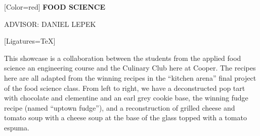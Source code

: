 \documentclass{article}
\begin{document}
{

	[Color=red]
	\fontsize{0.8in}{0.6in}\selectfont 
	\bfseries
	FOOD SCIENCE
}

\vspace{0.25in}

{
	\fontsize{0.4in}{0.4in}\selectfont
	ADVISOR: DANIEL LEPEK
}

\vspace{0.2in}

{
	[Ligatures=TeX]
	\fontsize{0.4in}{0.46in}\selectfont

	This showcase is a collaboration between the students from the applied
	food science an engineering course and the Culinary Club here at Cooper.
	The recipes here are all adapted from the winning recipes in the ``kitchen
	arena'' final project of the food science class.  From left to right, we
	have a deconstructed pop tart with chocolate and clementine and an earl
	grey cookie base, the winning fudge recipe (named ``uptown fudge''), and a
	reconstruction of grilled cheese and tomato soup with a cheese soup at the
	base of the glass topped with a tomato espuma.

}
\end{document}
